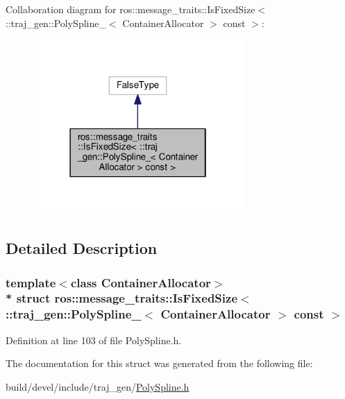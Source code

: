 Collaboration diagram for ros\+:\+:message\+\_\+traits\+:\+:Is\+Fixed\+Size$<$ \+:\+:traj\+\_\+gen\+:\+:Poly\+Spline\+\_\+$<$ Container\+Allocator $>$ const $>$\+:
\nopagebreak
\begin{figure}[H]
\begin{center}
\leavevmode
\includegraphics[width=226pt]{structros_1_1message__traits_1_1_is_fixed_size_3_01_1_1traj__gen_1_1_poly_spline___3_01_containeb04f1af25e391d722db25c1ea289965c}
\end{center}
\end{figure}


\subsection{Detailed Description}
\subsubsection*{template$<$class Container\+Allocator$>$\\*
struct ros\+::message\+\_\+traits\+::\+Is\+Fixed\+Size$<$ \+::traj\+\_\+gen\+::\+Poly\+Spline\+\_\+$<$ Container\+Allocator $>$ const  $>$}



Definition at line 103 of file Poly\+Spline.\+h.



The documentation for this struct was generated from the following file\+:\begin{DoxyCompactItemize}
\item 
build/devel/include/traj\+\_\+gen/\hyperlink{_poly_spline_8h}{Poly\+Spline.\+h}\end{DoxyCompactItemize}
